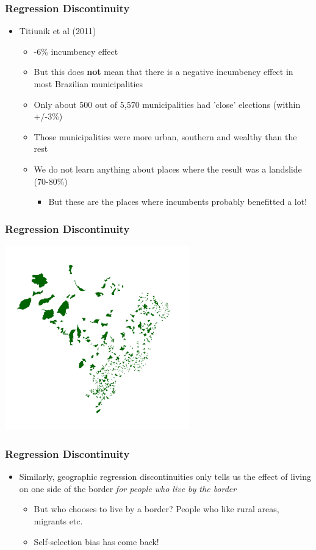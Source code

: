 \documentclass[xcolor=x11names,compress]{beamer}\usepackage[]{graphicx}\usepackage[]{xcolor}
\renewcommand{\(}{\begin{columns}}
\renewcommand{\)}{\end{columns}}
\newcommand{\<}[1]{\begin{column}{#1}}
\renewcommand{\>}{\end{column}}
\begin{document}
\begin{frame}
\frametitle{Regression Discontinuity}
\begin{itemize}
\item Titiunik et al (2011) 
\pause
\begin{itemize}
\item -6\% incumbency effect
\pause
\item But this does \textbf{not} mean that there is a negative incumbency effect in most Brazilian municipalities
\pause
\item Only about 500 out of 5,570 municipalities had 'close' elections (within +/-3\%)
\pause
\item Those municipalities were more urban, southern and wealthy than the rest
\pause
\item We do not learn anything about places where the result was a landslide (70-80\%)
\pause
\begin{itemize}
\item But these are the places where incumbents probably benefitted a lot!
\end{itemize}
\end{itemize}
\end{itemize}
\end{frame}

\begin{frame}
\frametitle{Regression Discontinuity}
\includegraphics[width=0.6\textwidth]{rd_LATE_map.png}
\end{frame}

\begin{frame}
\frametitle{Regression Discontinuity}
\begin{itemize}
\item Similarly, geographic regression discontinuities only tells us the effect of living on one side of the border \textit{for people who live by the border}
\pause
\begin{itemize}
\item But who chooses to live by a border? People who like rural areas, migrants etc.
\pause
\item Self-selection bias has come back!
\end{itemize}
\end{itemize}
\end{frame}
\end{document}
